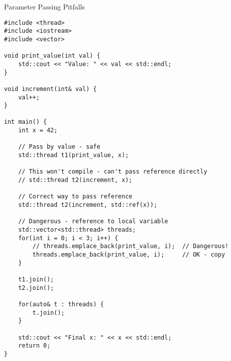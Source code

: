 \begin{frame}[fragile]{ Parameter Passing Pitfalls}
	\begin{verbatim}
#include <thread>
#include <iostream>
#include <vector>

void print_value(int val) {
    std::cout << "Value: " << val << std::endl;
}

void increment(int& val) {
    val++;
}

int main() {
    int x = 42;

    // Pass by value - safe
    std::thread t1(print_value, x);

    // This won't compile - can't pass reference directly
    // std::thread t2(increment, x);

    // Correct way to pass reference
    std::thread t2(increment, std::ref(x));

    // Dangerous - reference to local variable
    std::vector<std::thread> threads;
    for(int i = 0; i < 3; i++) {
        // threads.emplace_back(print_value, i);  // Dangerous!
        threads.emplace_back(print_value, i);     // OK - copy
    }

    t1.join();
    t2.join();

    for(auto& t : threads) {
        t.join();
    }

    std::cout << "Final x: " << x << std::endl;
    return 0;
}
	\end{verbatim}
\end{frame}

